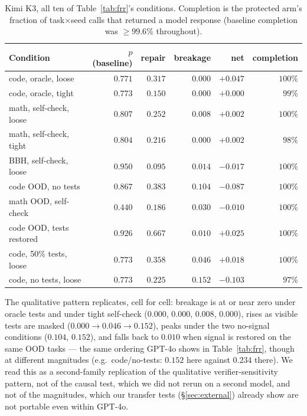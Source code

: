 \documentclass{article}
\begin{document}
\begin{table}[h]
\centering
\small
\caption{Kimi K3, all ten of Table~\ref{tab:frr}'s conditions. Completion is
the protected arm's fraction of task$\times$seed calls that returned a model
response (baseline completion was $\geq99.6\%$ throughout).}
\label{tab:kimi}
\begin{tabular}{lrrrrr}
\toprule
Condition & $p$(baseline) & repair & breakage & net & completion \\
\midrule
code, oracle, loose & $0.771$ & $0.317$ & $0.000$ & $+0.047$ & $100\%$ \\
code, oracle, tight & $0.773$ & $0.150$ & $0.000$ & $+0.000$ & $99\%$ \\
math, self-check, loose & $0.807$ & $0.252$ & $0.008$ & $+0.002$ & $100\%$ \\
math, self-check, tight & $0.804$ & $0.216$ & $0.000$ & $+0.002$ & $98\%$ \\
BBH, self-check, loose & $0.950$ & $0.095$ & $0.014$ & $-0.017$ & $100\%$ \\
code OOD, no tests & $0.867$ & $0.383$ & $0.104$ & $-0.087$ & $100\%$ \\
math OOD, self-check & $0.440$ & $0.186$ & $0.030$ & $-0.010$ & $100\%$ \\
code OOD, tests restored & $0.926$ & $0.667$ & $0.010$ & $+0.025$ & $100\%$ \\
code, 50\% tests, loose & $0.773$ & $0.358$ & $0.046$ & $+0.018$ & $100\%$ \\
code, no tests, loose & $0.773$ & $0.225$ & $0.152$ & $-0.103$ & $97\%$ \\
\bottomrule
\end{tabular}
\end{table}

The qualitative pattern replicates, cell for cell: breakage is at or near zero
under oracle tests and under tight self-check ($0.000$, $0.000$, $0.008$,
$0.000$), rises as visible tests are masked ($0.000\to0.046\to0.152$), peaks
under the two no-signal conditions ($0.104$, $0.152$), and falls back to
$0.010$ when signal is restored on the same OOD tasks --- the same ordering
GPT-4o shows in Table~\ref{tab:frr}, though at different magnitudes (e.g.\
code/no-tests: $0.152$ here against $0.234$ there). We read this as a
second-family replication of the qualitative verifier-sensitivity pattern,
not of the causal test, which we did not rerun on a second model, and not of
the magnitudes, which our transfer tests (\S\ref{sec:external}) already show
are not portable even within GPT-4o.
\end{document}
